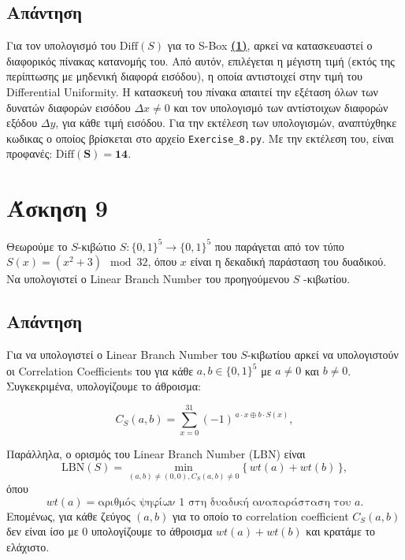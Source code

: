 \documentclass[12pt]{article}
\begin{document}
\subsection*{Απάντηση}

Για τον υπολογισμό του \( \mathrm{Diff}(S) \) για το S-Box  
\textbf{\protect\hyperref[sbox 1]{(1)}}, αρκεί να κατασκευαστεί ο διαφορικός 
πίνακας κατανομής του. Από αυτόν, επιλέγεται η μέγιστη τιμή (εκτός της περίπτωσης με 
μηδενική διαφορά εισόδου), η οποία αντιστοιχεί στην τιμή του Differential Uniformity.
\newline
\newline
Η κατασκευή του πίνακα απαιτεί την εξέταση όλων των δυνατών διαφορών εισόδου \( \Delta x 
\neq 0 \) και τον υπολογισμό των αντίστοιχων διαφορών εξόδου \( \Delta y \), για κάθε τιμή εισόδου. 
\newline
\newline
Για την εκτέλεση των υπολογισμών, αναπτύχθηκε κωδικας ο οποίος βρίσκεται στο αρχείο \texttt{Exercise\_8.py}.
\newline
\newline
Με την εκτέλεση του, είναι προφανές: \( \mathbf{\mathrm{Diff}(S) = 14} \).
\hfill \blacksquare
\section*{Άσκηση 9}
Θεωρούμε το \( S \)-κιβώτιο \( S: \{0,1\}^5 \to \{0,1\}^5 \) που παράγεται από τον τύπο \( S(x) = (x^2 + 3) \mod 32 \), όπου \( x \) είναι η δεκαδική παράσταση του δυαδικού. Να υπολογιστεί ο Linear Branch Number του προηγούμενου \( S \) -κιβωτίου.

\subsection*{Απάντηση}

Για να υπολογιστεί ο Linear Branch Number του \( S \)-κιβωτίου αρκεί να υπολογιστούν οι Correlation Coefficients του για κάθε \( a,b \in \{0,1\}^5 \) με \( a \neq 0 \) και \( b \neq 0 \). Συγκεκριμένα, υπολογίζουμε το άθροισμα:

\[
C_S(a,b) = \sum_{x=0}^{31} (-1)^{\,a\cdot x \oplus b\cdot S(x)},
\]

Παράλληλα, ο ορισμός του Linear Branch Number (LBN) είναι
\[
\mathrm{LBN}(S) = \min_{(a,b)\neq (0,0), C_S(a,b) \neq0 } \Big\{ \, wt(a) + wt(b) \, \Big\},
\]
όπου
\[
wt(a) = \text{αριθμός ψηφίων 1 στη δυαδική αναπαράσταση του } a.
\]
Επομένως, για κάθε ζεύγος \( (a,b) \) για το οποίο το correlation coefficient \( C_S(a,b) \) δεν είναι ίσο με 0 υπολογίζουμε το άθροισμα \( wt(a)+wt(b) \) και κρατάμε το ελάχιστο.
\end{document}

